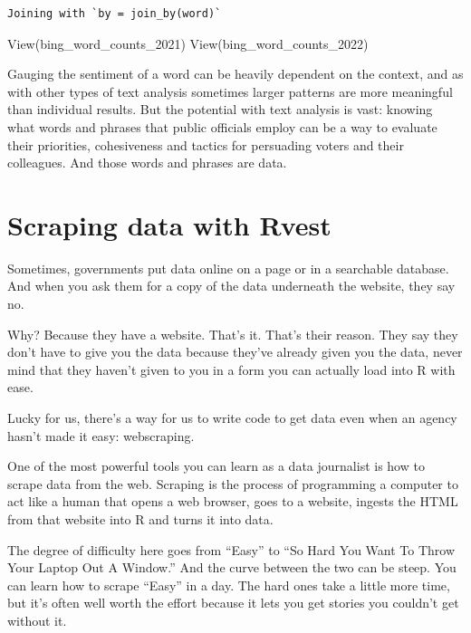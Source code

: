 \documentclass[
  letterpaper,
  DIV=11,
  numbers=noendperiod]{scrreprt}
\newenvironment{Shaded}{\begin{snugshade}}{\end{snugshade}}
\newcommand{\FunctionTok}[1]{\textcolor[rgb]{0.28,0.35,0.67}{#1}}
\newcommand{\NormalTok}[1]{\textcolor[rgb]{0.00,0.23,0.31}{#1}}
\begin{document}
\begin{verbatim}
Joining with `by = join_by(word)`
\end{verbatim}

\begin{Shaded}
\begin{Highlighting}[]
\FunctionTok{View}\NormalTok{(bing\_word\_counts\_2021)}
\FunctionTok{View}\NormalTok{(bing\_word\_counts\_2022)}
\end{Highlighting}
\end{Shaded}

Gauging the sentiment of a word can be heavily dependent on the context,
and as with other types of text analysis sometimes larger patterns are
more meaningful than individual results. But the potential with text
analysis is vast: knowing what words and phrases that public officials
employ can be a way to evaluate their priorities, cohesiveness and
tactics for persuading voters and their colleagues. And those words and
phrases are data.


\hypertarget{scraping-data-with-rvest}{%
\chapter{Scraping data with Rvest}\label{scraping-data-with-rvest}}

Sometimes, governments put data online on a page or in a searchable
database. And when you ask them for a copy of the data underneath the
website, they say no.

Why? Because they have a website. That's it. That's their reason. They
say they don't have to give you the data because they've already given
you the data, never mind that they haven't given to you in a form you
can actually load into R with ease.

Lucky for us, there's a way for us to write code to get data even when
an agency hasn't made it easy: webscraping.

One of the most powerful tools you can learn as a data journalist is how
to scrape data from the web. Scraping is the process of programming a
computer to act like a human that opens a web browser, goes to a
website, ingests the HTML from that website into R and turns it into
data.

The degree of difficulty here goes from ``Easy'' to ``So Hard You Want
To Throw Your Laptop Out A Window.'' And the curve between the two can
be steep. You can learn how to scrape ``Easy'' in a day. The hard ones
take a little more time, but it's often well worth the effort because it
lets you get stories you couldn't get without it.
\end{document}
